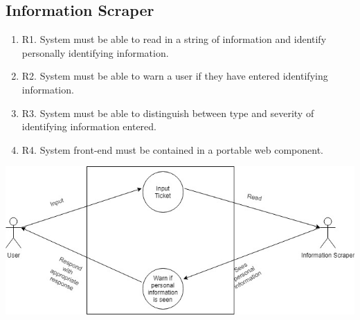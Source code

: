 \documentclass[11pt]{article}
\begin{document}
\subsection{Information Scraper}
\begin{enumerate}
    \item R1. System must be able to read in a string of information and identify personally identifying information.
    \item R2. System must be able to warn a user if they have entered identifying information. 
    \item R3. System must be able to distinguish between type and severity of identifying information entered.
    \item R4. System front-end must be contained in a portable web component.
\end{enumerate}
 \includegraphics[width=1.0\textwidth]{../../images/Information_Scraper_UCD.jpg}
\end{document}

